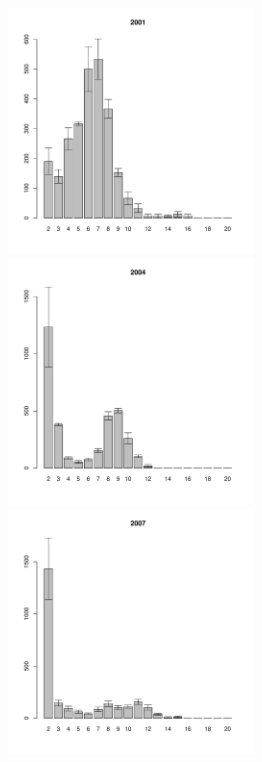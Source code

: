 \documentclass[12pt, a4paper]{article}
\begin{document}
\begin{figure}[h]

\begin{multicols}{3}
\hfill
\includegraphics[width=65mm]{../White_Sea/Estuatiy_Luvenga/sizestr2_2001_.pdf}
\hfill
\includegraphics[width=65mm]{../White_Sea/Estuatiy_Luvenga/sizestr2_2004_.pdf}
\hfill
\includegraphics[width=65mm]{../White_Sea/Estuatiy_Luvenga/sizestr2_2007_.pdf}
\end{multicols}


\end{figure}
\end{document}
